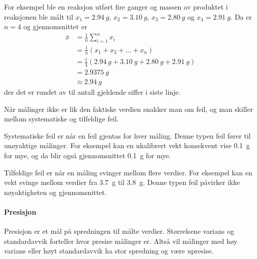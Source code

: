 \documentclass[hidelinks,12pt,norsk,a4paper,fleqn]{scrartcl}
\begin{document}
	For eksempel ble en reaksjon utført fire ganger og massen av produktet i reaksjonen ble målt til $x_1=\SI{2.94}{g}$, $x_2=\SI{3.10}{g}$, $x_3=\SI{2.80}{g}$ og $x_4=\SI{2.91}{g}$. Da er $n=4$ og gjennomsnittet er
	\begin{align*}
		\bar{x} &= \frac{1}{n}\sum_{i=1}^{n}x_i\\
		&=\frac{1}{n}\left(x_1 + x_2 + \dots + x_n\right)\\
		&=\frac{1}{4}\left(\SI{2.94}{g} + \SI{3.10}{g} + \SI{2.80}{g} + \SI{2.91}{g}\right)\\
		&=\SI{2.9375}{g}\\
		&\approx\SI{2.94}{g}
	\end{align*}
	der det er rundet av til antall gjeldende siffer i siste linje.
	
	Når målinger ikke er lik den faktiske verdien snakker man om feil, og man skiller mellom systematiske og tilfeldige feil. 
	
	Systematiske feil er når en feil gjentas for hver måling. Denne typen feil fører til unøyaktige målinger. For eksempel kan en ukalibrert vekt konsekvent vise \SI{0.1}{g} for mye, og da blir også gjennomsnittet \SI{0.1}{g} for mye.
	
	Tilfeldige feil er når en måling svinger mellom flere verdier. For eksempel kan en vekt svinge mellom verdier fra \SI{3.7}{g} til \SI{3.8}{g}. Denne typen feil påvirker ikke nøyaktigheten og gjennomsnittet.
	
	\begin{comment}
		\tikzstyle{every picture}+=[remember picture]
		\everymath{\displaystyle}
		\begin{equation*}
		\bar{x}=\frac{1}{n}\sum_{
		\tikz[baseline]{
		\node[anchor=base, inner sep=0] (idx)
		{$\scriptstyle i$};
		}=
		\tikz[baseline]{
		\node[anchor=base, inner sep=0] (idxs)
		{$\scriptstyle 1$};
		}
		}^{
		\tikz[baseline]{
		\node[anchor=base, inner sep=0] (idxe)
		{$\scriptstyle n$};
		}
		}
		\tikz[baseline]{
		\node[anchor=base, inner sep=0] (ele)
		{$x_i$};
		}
		\tikz[overlay]{
		\draw [->] (idx.south) to +(0,-.5) to +(-.5,-.5) node[left] {indeksvariabel};
		\draw [->] (idxs.south) to +(0,-.5) to +(.5,-.5) node[right]{startindeks};
		\draw [->] (idxe.north) to +(0,.5) to +(.5,.5) node[right]{sluttindeks};
		\draw [->] (ele.east) to +(.5,0) node[right]{uttrykk som summeres};
		\useasboundingbox (-5,2) rectangle (6,-2);
		}
		\end{equation*}
	\end{comment}
	
	\paragraph{Presisjon}
	Presisjon er et mål på spredningen til målte verdier. Størrelsene varians og standardavvik forteller hvor presise målinger er. Altså vil målinger med høy varians eller høyt standardavvik ha stor spredning og være upresise.
	
\end{document}

